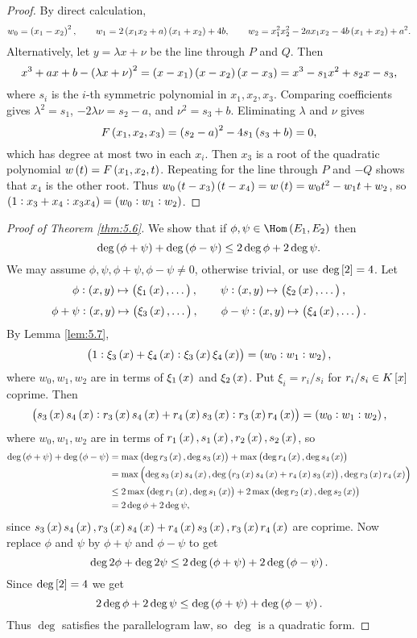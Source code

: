 \begin{proof}
By direct calculation,
$$ w_0 = \br{x_1 - x_2}^2, \qquad w_1 = 2\br{x_1x_2 + a}\br{x_1 + x_2} + 4b, \qquad w_2 = x_1^2x_2^2 - 2ax_1x_2 - 4b\br{x_1 + x_2} + a^2. $$
Alternatively, let $ y = \lambda x + \nu $ be the line through $ P $ and $ Q $. Then
$$ x^3 + ax + b - \br{\lambda x + \nu}^2 = \br{x - x_1}\br{x - x_2}\br{x - x_3} = x^3 - s_1x^2 + s_2x - s_3, $$
where $ s_i $ is the $ i $-th symmetric polynomial in $ x_1, x_2, x_3 $. Comparing coefficients gives $ \lambda^2 = s_1 $, $ -2\lambda\nu = s_2 - a $, and $ \nu^2 = s_3 + b $. Eliminating $ \lambda $ and $ \nu $ gives
$$ F\br{x_1, x_2, x_3} = \br{s_2 - a}^2 - 4s_1\br{s_3 + b} = 0, $$
which has degree at most two in each $ x_i $. Then $ x_3 $ is a root of the quadratic polynomial $ w\br{t} = F\br{x_1, x_2, t} $. Repeating for the line through $ P $ and $ -Q $ shows that $ x_4 $ is the other root. Thus $ w_0\br{t - x_3}\br{t - x_4} = w\br{t} = w_0t^2 - w_1t + w_2 $, so $ \br{1 : x_3 + x_4 : x_3x_4} = \br{w_0 : w_1 : w_2} $.
\end{proof}

\begin{proof}[Proof of Theorem \ref{thm:5.6}]
We show that if $ \phi, \psi \in \Hom\br{E_1, E_2} $ then
$$ \deg \br{\phi + \psi} + \deg \br{\phi - \psi} \le 2\deg \phi + 2\deg \psi. $$
We may assume $ \phi, \psi, \phi + \psi, \phi - \psi \ne 0 $, otherwise trivial, or use $ \deg \sbr{2} = 4 $. Let
$$ \phi : \br{x, y} \mapsto \br{\xi_1\br{x}, \dots}, \qquad \psi : \br{x, y} \mapsto \br{\xi_2\br{x}, \dots}, $$
$$ \phi + \psi : \br{x, y} \mapsto \br{\xi_3\br{x}, \dots}, \qquad \phi - \psi : \br{x, y} \mapsto \br{\xi_4\br{x}, \dots}. $$
By Lemma \ref{lem:5.7},
$$ \br{1 : \xi_3\br{x} + \xi_4\br{x} : \xi_3\br{x}\xi_4\br{x}} = \br{w_0 : w_1 : w_2}, $$
where $ w_0, w_1, w_2 $ are in terms of $ \xi_1\br{x} $ and $ \xi_2\br{x} $. Put $ \xi_i = r_i / s_i $ for $ r_i / s_i \in K\sbr{x} $ coprime. Then
$$ \br{s_3\br{x}s_4\br{x} : r_3\br{x}s_4\br{x} + r_4\br{x}s_3\br{x} : r_3\br{x}r_4\br{x}} = \br{w_0 : w_1 : w_2}, $$
where $ w_0, w_1, w_2 $ are in terms of $ r_1\br{x}, s_1\br{x}, r_2\br{x}, s_2\br{x} $, so
\begin{align*}
\deg \br{\phi + \psi} + \deg \br{\phi - \psi}
& = \max\br{\deg r_3\br{x}, \deg s_3\br{x}} + \max\br{\deg r_4\br{x}, \deg s_4\br{x}} \\
& = \max\br{\deg s_3\br{x}s_4\br{x}, \deg \br{r_3\br{x}s_4\br{x} + r_4\br{x}s_3\br{x}}, \deg r_3\br{x}r_4\br{x}} \\
& \le 2\max\br{\deg r_1\br{x}, \deg s_1\br{x}} + 2\max\br{\deg r_2\br{x}, \deg s_2\br{x}} \\
& = 2\deg \phi + 2\deg \psi,
\end{align*}
since $ s_3\br{x}s_4\br{x}, r_3\br{x}s_4\br{x} + r_4\br{x}s_3\br{x}, r_3\br{x}r_4\br{x} $ are coprime. Now replace $ \phi $ and $ \psi $ by $ \phi + \psi $ and $ \phi - \psi $ to get
$$ \deg 2\phi + \deg 2\psi \le 2\deg \br{\phi + \psi} + 2\deg \br{\phi - \psi}. $$
Since $ \deg \sbr{2} = 4 $ we get
$$ 2\deg \phi + 2\deg \psi \le \deg \br{\phi + \psi} + \deg \br{\phi - \psi}. $$
Thus $ \deg $ satisfies the parallelogram law, so $ \deg $ is a quadratic form.
\end{proof}

